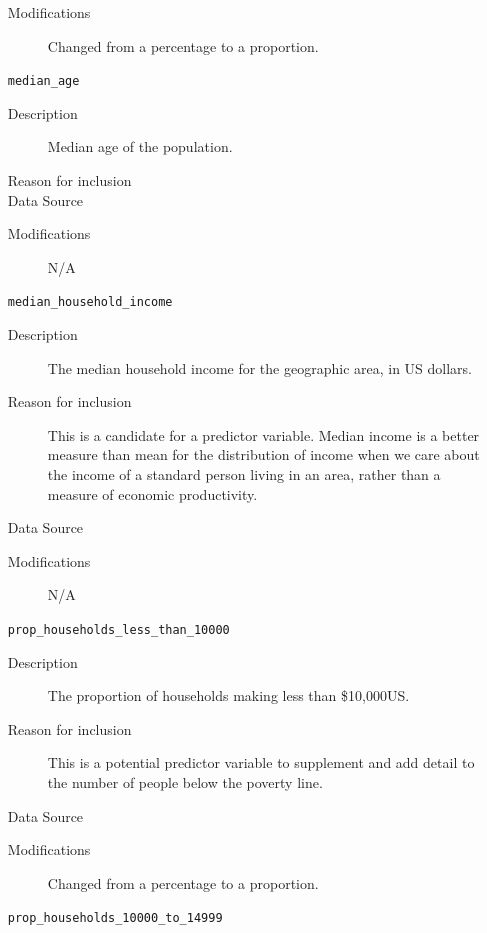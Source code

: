 \documentclass{article}
\begin{document}
\begin{itemize}[label={}, align=left]
\begin{description}
              \item[Modifications] Changed from a percentage to a proportion.
          \end{description}
    \item[\texttt{median\_age}] \
          \begin{description}
              \item[Description] Median age of the population.
              \item[Reason for inclusion] \agereason
              \item[Data Source] \cite{acs_demographics_data}
              \item[Modifications] N/A
          \end{description}
    \item[\texttt{median\_household\_income}] \
          \begin{description}
              \item[Description] The median household income for the geographic area, in US dollars.
              \item[Reason for inclusion] This is a candidate for a predictor
                    variable. Median income is a better measure than mean for the
                    distribution of income when we care about the income of a
                    standard person living in an area, rather than a measure of
                    economic productivity.
              \item[Data Source] \cite{acs_income_data}
              \item[Modifications] N/A
          \end{description}
    \item[\texttt{prop\_households\_less\_than\_10000}] \
          \begin{description}
              \item[Description] The proportion of households making less than
                    \$10,000US.
              \item[Reason for inclusion] This is a potential predictor variable
                    to supplement and add detail to the number of people below the
                    poverty line.
              \item[Data Source] \cite{acs_income_data}
              \item[Modifications] Changed from a percentage to a proportion.
          \end{description}
    \item[\texttt{prop\_households\_10000\_to\_14999}] \

\end{itemize}
\end{document}
